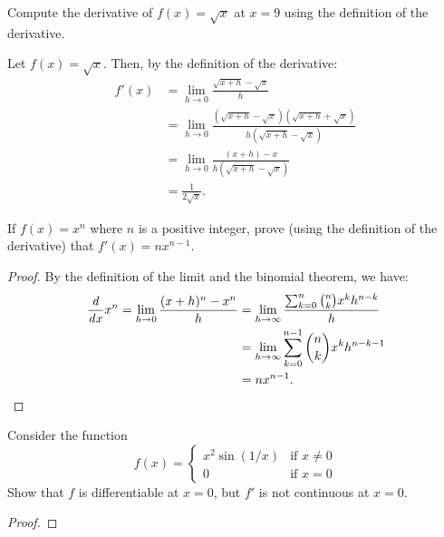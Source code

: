 \begin{problem}
  Compute the derivative of $f(x) = \sqrt{x}$ at $x = 9$ using the definition of the derivative.
  \vspace{\baselineskip}

  Let $f(x) = \sqrt{x}$. Then, by the definition of the derivative:
    \begin{align*}
      f'(x) &= \lim_{h \to 0}\frac{\sqrt{x+h} - \sqrt{x}}{h}\\
            &= \lim_{h \to 0}\frac{(\sqrt{x+h} - \sqrt{x})(\sqrt{x+h} + \sqrt{x})}{h(\sqrt{x+h} - \sqrt{x})}\\
            &= \lim_{h \to 0}\frac{(x + h) - x}{h(\sqrt{x+h} - \sqrt{x})}\\
            &= \frac{1}{2 \sqrt{x}}.
    \end{align*}
\end{problem}

\begin{problem}
  If $f(x) = x^{n}$ where $n$ is a positive integer, prove (using the definition of the derivative) that 
  $f'(x) = nx^{n-1}$.

  \begin{proof}
    By the definition of the limit and the binomial theorem, we have:
    \begin{align*}
       \dfrac{\mathit{d} }{\mathit{d} x} x^n = \lim_{h \to 0} \frac{(x + h)^{n} - x^{n}}{h} &= \lim_{h \to \infty} \frac{\sum_{k=0}^{n}\binom{n}{k}x^{k}h^{n-k}}{h}\\
                                                     &= \lim_{h \to \infty} \sum_{k=0}^{n-1}\binom{n}{k}x^{k}h^{n-k-1}\\
                                                     &= nx^{n-1}.
    \end{align*}
  \end{proof}
\end{problem}

\begin{problem}
  Consider the function
    \begin{equation*}
      f(x) = 
      \begin{cases}
        x^2 \sin(1/x) & \text{if } x \neq 0 \\
        0 & \text{if } x = 0
      \end{cases}
    \end{equation*}
  Show that $f$ is differentiable at $x = 0$, but $f'$ is not continuous at $x = 0$.

  \begin{proof}
  \end{proof}
\end{problem}

